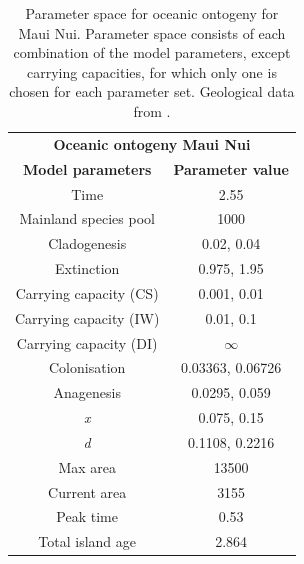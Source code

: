 \begin{table}[ht]
    \centering
    \caption{Parameter space for oceanic ontogeny for Maui Nui. Parameter space consists of each combination of the model parameters, except carrying capacities, for which only one is chosen for each parameter set. Geological data from \cite{lim_true_2017}.}
    \begin{tabular}{ c | c }
        \multicolumn{2}{c}{\textbf{Oceanic ontogeny Maui Nui}} \\
        \textbf{Model parameters} & \textbf{Parameter value} \\ 
        \hline
        \hline
        Time & 2.55 \\
        \hline
        Mainland species pool & 1000 \\
        \hline
        Cladogenesis & 0.02, 0.04 \\
        \hline
        Extinction & 0.975, 1.95 \\
        \hline
        Carrying capacity (CS) & 0.001, 0.01 \\
        \hline
        Carrying capacity (IW) & 0.01, 0.1 \\
        \hline
        Carrying capacity (DI) & $\infty$ \\
        \hline
        Colonisation & 0.03363, 0.06726 \\
        \hline
        Anagenesis & 0.0295, 0.059 \\
        \hline
        \textit{x} & 0.075, 0.15 \\
        \hline
        \textit{d} & 0.1108, 0.2216 \\
        \hline
        Max area & 13500 \\
        \hline
        Current area & 3155 \\
        \hline
        Peak time & 0.53 \\
        \hline
        Total island age & 2.864 \\
    \end{tabular}
    \label{tab:oceanic_ontogeny_young}
\end{table}

